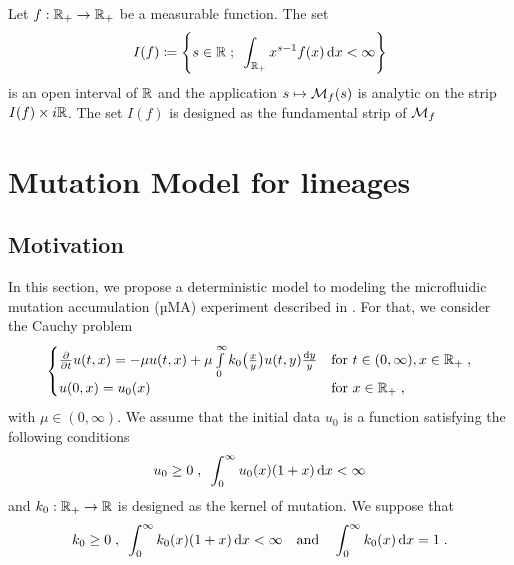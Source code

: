 \documentclass[11pt]{amsart}
\newcommand{\diff}{\,\mathrm{d}}
\begin{document}
\begin{lemma}\label{lm:interval_mellin}
    Let $f : \mathbb{R}_+ \to \mathbb{R}_+$ be a measurable function. The set 
    $$
    I(f) \coloneqq \left\{ s \in \RR \eqseppv \int_{\RR_+} x^{s-1} f(x) \diff x < \infty \right\}
    $$ 
    is an open interval of $\mathbb{R}$ and the application $s \mapsto \mathcal{M}_f(s)$ is analytic on the strip $I(f) \times i\mathbb{R}$. 
    The set $I(f)$ is designed as the fundamental strip of $\mathcal{M}_f$
\end{lemma}

\section{Mutation Model for lineages}
\label{s:lineage}
    \subsection{Motivation}\mbox{}
    In this section, we propose a deterministic model to modeling the microfluidic mutation accumulation (µMA) experiment described in \cite{robert2018mutation}. For that, we consider the Cauchy problem
    \begin{equation}
        \begin{cases}
        \frac{\partial}{\partial t}u(t,x) = - \mu u(t,x) + \mu \int\limits_{0}^{\infty} k_0\big( \frac{x}{y}\big)u(t,y) \frac{\mathrm dy}{y}
        & \text{for } t \in (0, \infty), x \in \mathbb{R}_+ \; ,
        \\
        u(0, x) = u_0(x)
        & \text{for } x \in \mathbb{R}_+
        \; ,
        \end{cases}
        \label{eq:main}
    \end{equation}
    with $\mu \in (0, \infty)$. We assume that the initial data $u_0$ is a function satisfying the following conditions 
    \begin{align}
        \label{H:u0_L1}
        u_0 \geq 0 \eqsepv \int_0^\infty u_0(x)(1+x)\diff x < \infty
    \end{align}
    and $k_0:   \mathbb{R}_+ \to \mathbb{R}$ is designed as the kernel of mutation. We suppose that 
    \begin{align}
        \label{H:k_0}
        k_0 \geq 0 \eqsepv \int_0^\infty k_0(x)(1+x)\diff x < \infty \mtext{and} \int_0^\infty k_0(x)\diff x = 1 \eqfinp
    \end{align}
\end{document}
